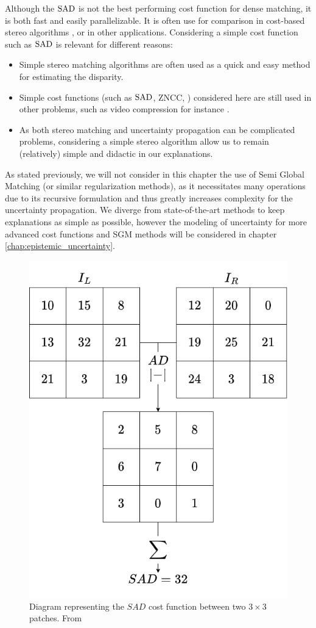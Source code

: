 \begin{remark}
    Although the ${\mathrm{SAD}}$ is not the best performing cost function for dense matching, it is both fast and easily parallelizable. It is often use for comparison in cost-based stereo algorithms \cite{hirschmuller_evaluation_2007, zbontar_stereo_2016}, or in other applications. Considering a simple cost function such as ${\mathrm{SAD}}$ is relevant for different reasons:
    \begin{itemize}
        \item Simple stereo matching algorithms are often used as a quick and easy method for estimating the disparity.
        \item Simple cost functions (such as ${\mathrm{SAD}}$, ZNCC, \etc) considered here are still used in other problems, such as video compression for instance \cite{richardson_h264_2006}.
        \item As both stereo matching and uncertainty propagation can be complicated problems, considering a simple stereo algorithm allow us to remain (relatively) simple and didactic in our explanations. 
    \end{itemize}
\end{remark}

As stated previously, we will not consider in this chapter the use of Semi Global Matching (or similar regularization methods), as it necessitates many operations due to its recursive formulation and thus greatly increases complexity for the uncertainty propagation. We diverge from state-of-the-art methods to keep explanations as simple as possible, however the modeling of uncertainty for more advanced cost functions and SGM methods will be considered in chapter \ref{chap:epistemic_uncertainty}.

\begin{figure}
    \centering
    \includegraphics[width=0.5\linewidth]{Images/Chap_4/SAD.png}
    \caption{Diagram representing the $SAD$ cost function between two $3\times3$ patches. From \cite{malinowski_uncertainty_2024}}
    \label{fig:SAD}
\end{figure}

